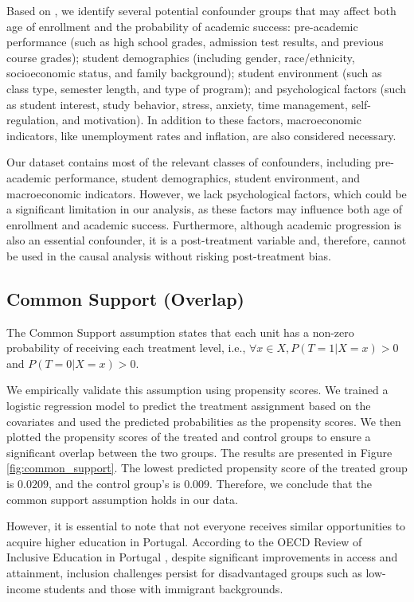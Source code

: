 \documentclass{article}
\begin{document}
Based on \citet{alyahyan2020predicting}, we identify several potential confounder groups that may affect both age of enrollment and the probability of academic success: pre-academic performance (such as high school grades, admission test results, and previous course grades); student demographics (including gender, race/ethnicity, socioeconomic status, and family background); student environment (such as class type, semester length, and type of program); and psychological factors (such as student interest, study behavior, stress, anxiety, time management, self-regulation, and motivation). In addition to these factors, macroeconomic indicators, like unemployment rates and inflation, are also considered necessary.

Our dataset contains most of the relevant classes of confounders, including pre-academic performance, student demographics, student environment, and macroeconomic indicators. However, we lack psychological factors, which could be a significant limitation in our analysis, as these factors may influence both age of enrollment and academic success. Furthermore, although academic progression is also an essential confounder, it is a post-treatment variable and, therefore, cannot be used in the causal analysis without risking post-treatment bias.

\subsection{Common Support (Overlap)}

The Common Support assumption states that each unit has a non-zero probability of receiving each treatment level, i.e., $\forall x \in X, P(T=1|X=x) > 0$ and $P(T=0|X=x) > 0$.

We empirically validate this assumption using propensity scores. We trained a logistic regression model to predict the treatment assignment based on the covariates and used the predicted probabilities as the propensity scores. We then plotted the propensity scores of the treated and control groups to ensure a significant overlap between the two groups. The results are presented in Figure \ref{fig:common_support}. The lowest predicted propensity score of the treated group is $0.0209$, and the control group's is $0.009$. Therefore, we conclude that the common support assumption holds in our data.

However, it is essential to note that not everyone receives similar opportunities to acquire higher education in Portugal. According to the OECD Review of Inclusive Education in Portugal \citep{/content/publication/a9c95902-en}, despite significant improvements in access and attainment, inclusion challenges persist for disadvantaged groups such as low-income students and those with immigrant backgrounds. 
\end{document}
